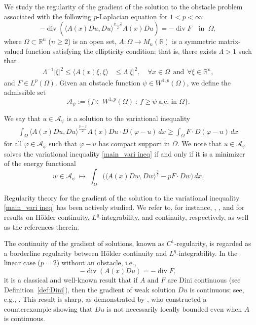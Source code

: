 \documentclass[reqno]{amsart}
\numberwithin{equation}{section}
\theoremstyle{plain}
\theoremstyle{definition}
\theoremstyle{remark}
\DeclareMathOperator{\dv}{div}
\providecommand{\set}[1]{\{#1\}}
\providecommand{\abs}[1]{\lvert#1\rvert}
\providecommand{\ip}[1]{\langle#1\rangle}
\newcommand{\bR}{\mathbb{R}}
\begin{document}
We study the regularity of the gradient of the solution to the obstacle problem associated with the following $p$-Laplacian equation for $1<p<\infty$:
\begin{equation} \label{main_eq}
-\dv ( \ip{A(x)Du, Du }^{\frac{p-2}{2}} A(x) Du)=-\dv F \quad\text{in }\ \Omega,
\end{equation}
where $\Omega \subset \mathbb{R}^n$ ($n\ge 2$) is an open set, $A:\Omega\to M_n(\mathbb{R})$ is a symmetric matrix-valued function satisfying the ellipticity condition; that is, there exists $\Lambda>1$ such that
\begin{equation} \label{elliptic}
\begin{split}
\Lambda^{-1}\abs{\xi}^2\leq \ip{A(x)\xi,\xi}&\leq \Lambda\abs{\xi}^2,\quad\forall x\in \Omega\ \ \text{and}\ \ \forall\xi\in\bR^n,
\end{split}
\end{equation}
and $F\in L^p(\Omega)$.
Given an obstacle function $\psi \in W^{1,p}(\Omega)$, we define the admissible set
\[
\mathcal{A}_\psi:=\set{f\in W^{1,p}(\Omega)~:~f\geq\psi~\text{a.e. in $\Omega$}}.
\]

We say that $u\in \mathcal{A}_\psi$ is a solution to the variational inequality
\begin{align} \label{main_vari ineq}
\int_\Omega \ip{A(x) Du,Du}^{\frac{p-2}{2}} A(x)Du\cdot D(\varphi-u)  \,dx \geq \int_\Omega F\cdot D(\varphi-u) \,dx
\end{align}
for all $\varphi\in\mathcal{A}_\psi$ such that $\varphi-u$ has compact support in $\Omega$. We note that $u\in \mathcal{A}_\psi$ solves the variational inequality \eqref{main_vari ineq} if and only if it is a minimizer of the energy functional
\[
w\in \mathcal{A}_\psi~\mapsto~ \int_\Omega\big( \ip{A(x)Dw,Dw}^{\frac{p}{2}}-pF\cdot Dw \big) \,dx.
\]

Regularity theory for the gradient of the solution to the variational inequality \eqref{main_vari ineq} has been actively studied. We refer to, for instance, \cite{Choe91,ChoeLewis91,Fuchs90}, \cite{BDM11,BCW12}, and \cite{Ok17} for results on H\"older continuity, $L^q$-integrability, and continuity, respectively, as well as the references therein.

The continuity of the gradient of solutions, known as $C^1$-regularity, is regarded as a borderline regularity between H\"older continuity and $L^q$-integrability. In the linear case ($p=2$) without an obstacle, i.e.,
 \begin{equation}\label{eq_linear}
 -\dv (A(x) Du)= -\dv F,
 \end{equation}
it is a classical and well-known result that if $A$ and $F$ are Dini continuous (see Definition~\ref{def:Dini}), then the gradient of weak solution $Du$ is continuous; see, e.g., \cite{HW55,Burch78}. This result is sharp, as demonstrated by \cite{JMV09}, who constructed a counterexample showing that $Du$ is not necessarily locally bounded even when $A$ is continuous.
 
\end{document}
